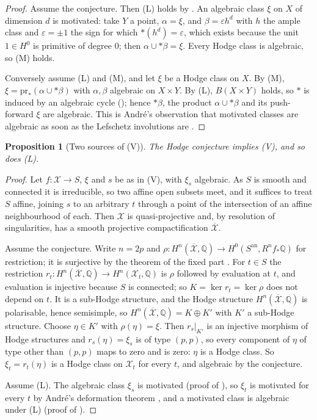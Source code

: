 \documentclass[11pt,reqno]{amsart}
\theoremstyle{plain}
\newtheorem{proposition}[theorem]{Proposition}
\theoremstyle{definition}
\theoremstyle{remark}
\newcommand{\QQ}{\mathbb{Q}}
\newcommand{\cX}{\mathcal{X}}
\begin{document}
\begin{proof}
Assume the conjecture. Then \textup{(L)} holds by \cite[Theorem~12.2]{paperI}. An
algebraic class $\xi$ on $X$ of dimension $d$ is motivated: take $Y$ a point,
$\alpha=\xi$, and $\beta=\varepsilon h^{d}$ with $h$ the ample class and
$\varepsilon=\pm1$ the sign for which ${*}(h^{d})=\varepsilon$, which exists
because the unit $1\in H^{0}$ is primitive of degree $0$; then
$\alpha\cup{*}\beta=\xi$. Every Hodge class is algebraic, so \textup{(M)}
holds.

Conversely assume \textup{(L)} and \textup{(M)}, and let $\xi$ be a Hodge
class on $X$. By \textup{(M)}, $\xi=\mathrm{pr}_{*}(\alpha\cup{*}\beta)$ with
$\alpha,\beta$ algebraic on $X\times Y$. By \textup{(L)}, $B(X\times Y)$
holds, so ${*}$ is induced by an algebraic cycle
(); hence ${*}\beta$, the product
$\alpha\cup{*}\beta$ and its push-forward $\xi$ are algebraic. This is
Andr\'e's observation that motivated classes are algebraic as soon as the
Lefschetz involutions are \cite[\S2.1]{And96b}.
\end{proof}

\begin{proposition}[Two sources of (V)]\label{prop:lefvhc}
The Hodge conjecture implies \textup{(V)}, and so does \textup{(L)}.
\end{proposition}

\begin{proof}
Let $f\colon\cX\to S$, $\xi$ and $s$ be as in \textup{(V)}, with $\xi_{s}$
algebraic. As $S$ is smooth and connected it is irreducible, so two affine
open subsets meet, and it suffices to treat $S$ affine, joining $s$ to an
arbitrary $t$ through a point of the intersection of an affine neighbourhood
of each. Then $\cX$ is quasi-projective and, by resolution of singularities,
has a smooth projective compactification $\overline{\cX}$.

Assume the conjecture. Write $n=2p$ and
$\rho\colon H^{n}(\overline{\cX},\QQ)\to H^{0}(S^{\mathrm{an}},R^{n}f_{*}\QQ)$
for restriction; it is surjective by the theorem of the fixed part
\cite[4.1.1(ii)]{Del71}. For $t\in S$ the restriction
$r_{t}\colon H^{n}(\overline{\cX},\QQ)\to H^{n}(\cX_{t},\QQ)$ is $\rho$
followed by evaluation at $t$, and evaluation is injective because $S$ is
connected; so $K=\ker r_{t}=\ker\rho$ does not depend on $t$. It is a
sub-Hodge structure, and the Hodge structure $H^{n}(\overline{\cX},\QQ)$ is
polarisable, hence semisimple, so $H^{n}(\overline{\cX},\QQ)=K\oplus K'$
with $K'$ a sub-Hodge structure. Choose $\eta\in K'$ with $\rho(\eta)=\xi$.
Then $r_{s}|_{K'}$ is an injective morphism of Hodge structures and
$r_{s}(\eta)=\xi_{s}$ is of type $(p,p)$, so every component of $\eta$ of
type other than $(p,p)$ maps to zero and is zero: $\eta$ is a Hodge class.
So $\xi_{t}=r_{t}(\eta)$ is a Hodge class on $\cX_{t}$ for every $t$, and
algebraic by the conjecture.

Assume \textup{(L)}. The algebraic class $\xi_{s}$ is motivated (proof of
), so $\xi_{t}$ is motivated for every $t$ by Andr\'e's
deformation theorem \cite[Th\'eor\`eme~0.5]{And96b}, and a motivated class is
algebraic under \textup{(L)} (proof of ).
\end{proof}
\end{document}
